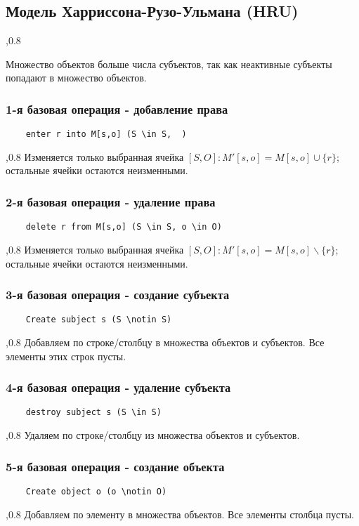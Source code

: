 \documentclass[a4paper,12pt]{report}
\begin{document}
	\subsection{Модель Харриссона-Рузо-Ульмана (HRU)}
	,0.8

	Множество объектов больше числа субъектов, так как неактивные субъекты попадают в множество объектов.

	\subsubsection{1-я базовая операция - добавление права}
	\begin{verbatim}
	enter r into M[s,o] (S \in S,  )
	\end{verbatim}
	,0.8
	Изменяется только выбранная ячейка $[S,O]: M'[s,o] = M[s,o]\cup\{r\}$; остальные ячейки остаются неизменными.

	\subsubsection{2-я базовая операция - удаление права}
	\begin{verbatim}
	delete r from M[s,o] (S \in S, o \in O)
	\end{verbatim}
	,0.8
	Изменяется только выбранная ячейка $[S,O]: M'[s,o] = M[s,o]\backslash \{r\}$; остальные ячейки остаются неизменными.

	\subsubsection{3-я базовая операция - создание субъекта}
	\begin{verbatim}
	Create subject s (S \notin S)
	\end{verbatim}
	,0.8
	Добавляем по строке/столбцу в множества объектов и субъектов. Все элементы этих строк пусты.


	\subsubsection{4-я базовая операция - удаление субъекта}
	\begin{verbatim}
	destroy subject s (S \in S)
	\end{verbatim}
	,0.8
	Удаляем по строке/столбцу из множества объектов и субъектов.

	\subsubsection{5-я базовая операция - создание объекта}
	\begin{verbatim}
	Create object o (o \notin O)
	\end{verbatim}
	,0.8
	Добавляем по элементу в множества объектов. Все элементы столбца пусты.
\end{document}
